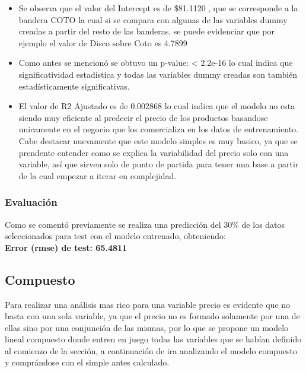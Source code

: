 \begin{itemize}
	\item Se observa que el valor del Intercept es de \$81.1120 , que se corresponde a la bandera COTO la cual si se compara con algunas de las variables dummy creadas a partir del resto de las banderas, se puede evidenciar que por ejemplo el valor de Disco sobre Coto es 4.7899
	
	\item Como antes se mencionó se obtuvo un p-value: < 2.2e-16 lo cual indica que significatividad estadística y todas las variables dummy creadas son también estadísticamente significativas. 
    
    \item El valor de R2 Ajustado es de 0.002868 lo cual indica que el modelo no esta siendo muy eficiente al predecir el precio de los productos basandose unicamente en el negocio que los comercializa en los datos de entrenamiento.\\
    Cabe destacar nuevamente que este modelo simples es muy basico, ya que se prendente entender como se explica la variabilidad del precio solo con una variable, así que sirven solo de punto de partida para tener una base a partir de la cual empezar a iterar en complejidad.
\end{itemize}
	
\subsubsection{Evaluación}
Como se comentó previamente se realiza una predicción del 30\% de los datos seleccionados para test con el modelo entrenado, obteniendo:\\
\textbf{Error (rmse) de test: 65.4811}

\subsection{Compuesto}


Para realizar una análisis mas rico para una variable precio es evidente que no basta con una sola variable, ya que el precio no es formado solamente por una de ellas sino por una conjunción de las mismas, por lo que se propone un modelo lineal compuesto donde entren en juego todas las variables que se habían definido al comienzo de la sección, a continuación de ira analizando el modelo compuesto y comprándose con el simple antes calculado.\\



